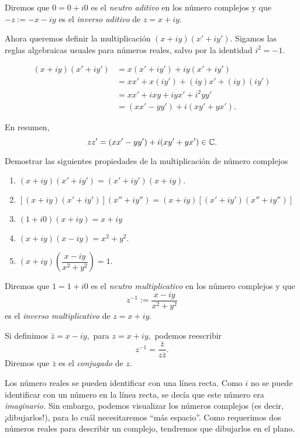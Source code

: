 Diremos que $0=0+i0$ es el \emph{neutro aditivo} en los número complejos y que $-z:=-x-iy$ es el \emph{inverso aditivo}
de $z=x+iy.$

Ahora queremos definir la multiplicación $(x+iy)(x'+iy').$ Sigamos las reglas algebraicas usuales para números reales,
salvo por la identidad $i^2=-1.$

\begin{align*}
(x+iy)(x'+iy')&= x(x'+iy')+iy(x'+iy')\\
&= xx'+x(iy')+(iy)x'+(iy)(iy') \\
&= xx' + ixy +iyx' + i^{2}yy' \\
&= (xx'-yy')+i(xy'+yx').
\end{align*}

En resumen,
 $$
zz'= (xx'-yy')+i(xy'+yx') \in \mathbb{C}.
 $$

\begin{problema}
Demostrar las siguientes propiedades de la multiplicación de número complejos
\begin{enumerate}
 \item $(x+iy)(x'+iy')=(x'+iy')(x+iy).$
 \item $\left[ (x+iy)(x'+iy') \right] (x''+iy'')= (x+iy)\left[ (x'+iy') (x''+iy'') \right]$
 \item $(1+i0)(x+iy)=x+iy$
 \item $(x+iy)(x-iy)=x^2+y^2.$
 \item $(x+iy)\left( \dfrac{x-iy}{x^2+y^2} \right)=1.$
\end{enumerate}
\end{problema}

Diremos que $1=1+i0$ es el \emph{neutro multiplicativo} en los número complejos y que $$
z^{-1}:=\dfrac{x-iy}{x^2+y^2} 
$$ es el \emph{inverso multiplicativo} de $z=x+iy.$

Si definimos $\bar{z}=x-iy,$ para $z=x+iy,$ podemos reescribir $$z^{-1}=\dfrac{\bar{z}}{z\bar{z}}.$$
Diremos que $\bar{z}$ es el \emph{conjugado} de $z.$

\begin{rem}
Los número reales se pueden identificar con una línea recta. Como $i$ no se puede identificar con un número en la línea
recta, se decía que este número era \emph{imaginario.} Sin embargo, podemos visualizar los números complejos (es decir,
¡dibujarlos!), para lo cuál necesitaremos ``más espacio''. Como requerimos dos números reales para describir un
complejo, tendremos que dibujarlos en el plano.
\end{rem}

